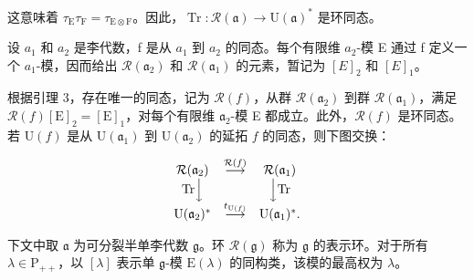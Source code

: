 这意味着 \(\tau_{\mathrm{E}}\tau_{\mathrm{F}} = \tau_{\mathrm{E}\otimes \mathrm{F}}\)。因此，\(\operatorname {Tr}:\mathcal{R}(\mathfrak{a})\to \mathrm{U}(\mathfrak{a})^*\) 是环同态。

设 \(a_{1}\) 和 \(a_{2}\) 是李代数，f 是从 \(a_{1}\) 到 \(a_{2}\) 的同态。每个有限维 \(a_{2}\)-模 E 通过 f 定义一个 \(a_{1}\)-模，因而给出 \(\mathcal{R}(\mathfrak{a}_{2})\) 和 \(\mathcal{R}(\mathfrak{a}_{1})\) 的元素，暂记为 \([E]_{2}\) 和 \([E]_{1}\)。

根据引理 3，存在唯一的同态，记为 \(\mathcal{R}(f)\)，从群 \(\mathcal{R}(\mathfrak{a}_2)\) 到群 \(\mathcal{R}(\mathfrak{a}_1)\)，满足 \(\mathcal{R}(f)[\mathrm{E}]_2 = [\mathrm{E}]_1\)，对每个有限维 \(\mathfrak{a}_2\)-模 E 都成立。此外，\(\mathcal{R}(f)\) 是环同态。若 \(\mathrm{U}(f)\) 是从 \(\mathrm{U}(\mathfrak{a}_1)\) 到 \(\mathrm{U}(\mathfrak{a}_2)\) 的延拓 \(f\) 的同态，则下图交换：

\[
\begin{array}{c c c} \mathcal {R} (\mathfrak {a} _ {2}) & \stackrel {{\mathcal {R} (f)}} {{\longrightarrow}} & \mathcal {R} (\mathfrak {a} _ {1}) \\ \mathrm{Tr} \Big \downarrow & & \Big \downarrow \mathrm{Tr} \\ \mathrm{U} (\mathfrak {a} _ {2}) ^ {*} & \stackrel {{t _ {\mathrm{U} (f)}}} {{\longrightarrow}} & \mathrm{U} (\mathfrak {a} _ {1}) ^ {*}. \end{array}
\]

下文中取 \(\mathfrak{a}\) 为可分裂半单李代数 \(\mathfrak{g}\)。环 \(\mathcal{R}(\mathfrak{g})\) 称为 \(\mathfrak{g}\) 的表示环。对于所有 \(\lambda \in \mathrm{P}_{++}\)，以 \([\lambda]\) 表示单 \(\mathfrak{g}\)-模 \(\mathrm{E}(\lambda)\) 的同构类，该模的最高权为 \(\lambda\)。

